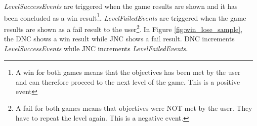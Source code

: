 \textit{LevelSuccessEvents} are triggered when the game results are shown and it has been concluded as a win result\footnote{A win for both games means that the objectives has been met by the user and can therefore proceed to the next level of the game. This is a positive event}. \textit{LevelFailedEvents} are triggered when the game results are shown as a fail result to the user\footnote{A fail for both games means that objectives were NOT met by the user. They have to repeat the level again. This is a negative event.}. In Figure \ref{fig:win_lose_sample}, the DNC shows a win result while JNC shows a fail result. DNC increments \textit{LevelSuccessEvents} while JNC increments \textit{LevelFailedEvents}.
